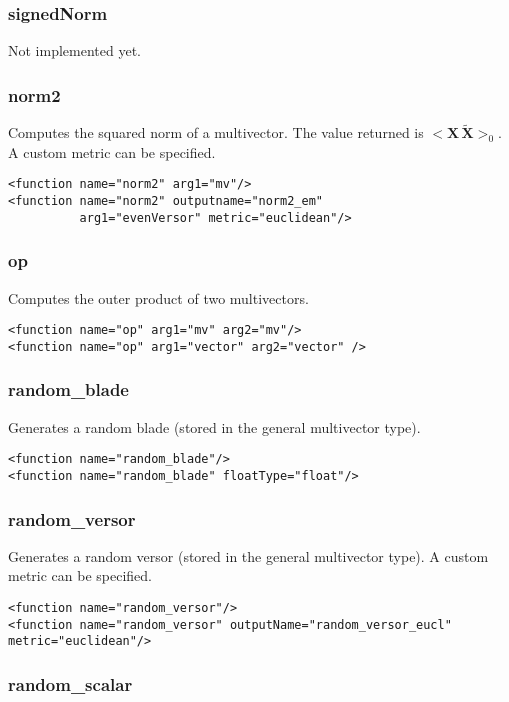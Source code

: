 \documentclass[10pt, a4paper]{article}
\newcommand{\gav}[1]{\ensuremath{\mathbf{#1}}}
\newcommand{\gp}{\,}
\newcommand{\rev}[1]{\widetilde{#1}}
\begin{document}
\subsubsection*{signedNorm}

Not implemented yet.

\subsubsection*{norm2}

Computes the squared norm of a multivector.
The value returned is $< \gav{X} \gp \rev{\gav{X}} >_{0}$.
A custom metric can be specified.
\begin{verbatim}
<function name="norm2" arg1="mv"/>
<function name="norm2" outputname="norm2_em"
          arg1="evenVersor" metric="euclidean"/>
\end{verbatim}

\subsubsection*{op}

Computes the outer product of two multivectors.
\begin{verbatim}
<function name="op" arg1="mv" arg2="mv"/>
<function name="op" arg1="vector" arg2="vector" />
\end{verbatim}

\subsubsection*{random\_blade}

Generates a random blade (stored in the general multivector type).
\begin{verbatim}
<function name="random_blade"/>
<function name="random_blade" floatType="float"/>
\end{verbatim}


\subsubsection*{random\_versor}

Generates a random versor (stored in the general multivector type).
A custom metric can be specified.
\begin{verbatim}
<function name="random_versor"/>
<function name="random_versor" outputName="random_versor_eucl" metric="euclidean"/>
\end{verbatim}


\subsubsection*{random\_scalar}
\end{document}

